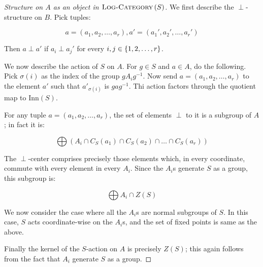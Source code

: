 \documentclass[a4paper]{amsart}
\newcommand{\logcategory}[1]{\textsc{Log-Category}\left(#1\right)}
\newcommand{\inn}[1]{\text{Inn}\left(#1\right)}
\begin{document}
\begin{proof}[Structure on $A$ as an object in $\logcategory{S}$]
  We first describe the $\perp$-structure on $B$. Pick tuples:

  $$a = (a_1, a_2, \ldots, a_r), a' = (a_1', a_2', \ldots,a_r')$$

  Then $a \perp a'$ if $a_i \perp a_j'$ for every $i,j \in
  \left\{ 1,2, \ldots, r \right\}$.

  We now describe the action of $S$ on $A$. For $g \in S$ and $a \in
  A$, do the following. Pick $\sigma(i)$ as the index of the group
  $gA_ig^{-1}$.  Now send $a = (a_1,a_2,\ldots,a_r)$ to the element
  $a'$ such that $a'_{\sigma(i)}$ is $gag^{-1}$. Thi action factors
  through the quotient map to $\inn{S}$.

  For any tuple $a = (a_1,a_2,\ldots,a_r)$, the set of elements $\perp$
  to it is a subgroup of $A$; in fact it is:

  $$\bigoplus \left( A_i \cap C_S(a_1) \cap C_S(a_2) \cap \ldots \cap C_S(a_r)\right)$$

  The $\perp$-center comprises precisely those elements which, in
  every coordinate, commute with every element in every $A_i$. Since
  the $A_i$s generate $S$ as a group, this subgroup is:

  $$\bigoplus A_i \cap Z(S)$$

  We now consider the case where all the $A_i$s are normal subgroups
  of $S$. In this case, $S$ acts coordinate-wise on the $A_i$s, and
  the set of fixed points is same as the above.

  Finally the kernel of the $S$-action on $A$ is precisely $Z(S)$;
  this again follows from the fact that $A_i$ generate $S$ as a group.
\end{proof}
\end{document}
